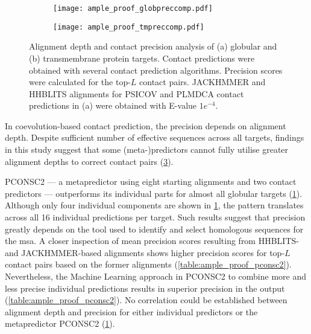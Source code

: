 \begin{figure}[H]
    \centering
    \begin{subfigure}[b]{\textwidth}
        \centering
        \texttt{[image: ample\_proof\_globpreccomp.pdf]}
        \caption{}
        \label{fig:ample_proof_globpreccomp}
    \end{subfigure}
    
    \begin{subfigure}[b]{\textwidth}
        \centering
        \texttt{[image: ample\_proof\_tmpreccomp.pdf]}
        \caption{}
        \label{fig:ample_proof_tmpreccomp}
    \end{subfigure}
    
    \caption[Alignment depth and contact precision analysis of all protein targets]{Alignment depth and contact precision analysis of (a) globular and (b) transmembrane protein targets. Contact predictions were obtained with several contact prediction algorithms. Precision scores were calculated for the top-$L$ contact pairs. JACKHMMER and HHBLITS alignments for PSICOV and PLMDCA contact predictions in (a) were obtained with E-value $1e^{-4}$.} 
    \label{fig:ample_proof_preccomp}
\end{figure}

In coevolution-based contact prediction, the precision depends on alignment depth. Despite sufficient number of effective sequences across all targets, findings in this study suggest that some (meta-)predictors cannot fully utilise greater alignment depths to correct contact pairs (\cref{fig:ample_proof_preccomp}). 

PCONSC2 --- a metapredictor using eight starting alignments and two contact predictors --- outperforms its individual parts for almost all globular targets (\cref{fig:ample_proof_globpreccomp}). Although only four individual components are shown in \cref{fig:ample_proof_globpreccomp}, the pattern translates across all 16 individual predictions per target. Such results suggest that precision greatly depends on the tool used to identify and select homologous sequences for the \gls{msa}. A closer inspection of mean precision scores resulting from HHBLITS- and JACKHMMER-based alignments shows higher precision scores for top-$L$ contact pairs based on the former alignments (\cref{table:ample_proof_pconsc2}). Nevertheless, the Machine Learning approach in PCONSC2 to combine more and less precise individual predictions results in superior precision in the output (\cref{table:ample_proof_pconsc2}). No correlation could be established between alignment depth and precision for either individual predictors or the metapredictor PCONSC2 (\cref{fig:ample_proof_globpreccomp}). 

